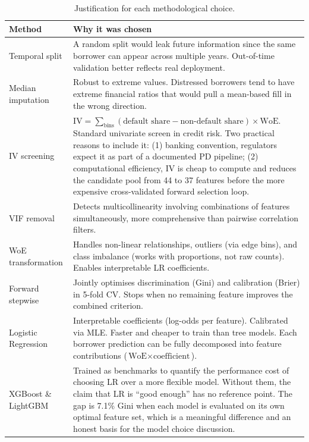 \documentclass[a4paper,11pt]{article}
\begin{document}
\begin{table}[H]
\centering
\begin{tabular}{L{3.5cm} L{11cm}}
\toprule
\textbf{Method} & \textbf{Why it was chosen} \\
\midrule
Temporal split &
  A random split would leak future information since the same borrower can
  appear across multiple years. Out-of-time validation better reflects real deployment. \\[0.4em]
Median imputation &
  Robust to extreme values. Distressed borrowers tend to have extreme financial
  ratios that would pull a mean-based fill in the wrong direction. \\[0.4em]
IV screening &
  $\text{IV} = \sum_{\text{bins}} (\text{default share} - \text{non-default share})
  \times \text{WoE}$. Standard univariate screen in credit risk. Two practical
  reasons to include it: (1) banking convention, regulators expect it as part of
  a documented PD pipeline; (2) computational efficiency, IV is cheap to compute
  and reduces the candidate pool from 44 to 37 features before the more expensive
  cross-validated forward selection loop. \\[0.4em]
VIF removal &
  Detects multicollinearity involving combinations of features simultaneously,
  more comprehensive than pairwise correlation filters. \\[0.4em]
WoE transformation &
  Handles non-linear relationships, outliers (via edge bins), and class imbalance
  (works with proportions, not raw counts). Enables interpretable LR coefficients. \\[0.4em]
Forward stepwise &
  Jointly optimises discrimination (Gini) and calibration (Brier) in 5-fold CV.
  Stops when no remaining feature improves the combined criterion. \\[0.4em]
Logistic Regression &
  Interpretable coefficients (log-odds per feature). Calibrated via MLE. Faster
  and cheaper to train than tree models. Each borrower prediction can be fully
  decomposed into feature contributions ($\text{WoE} \times \text{coefficient}$). \\[0.4em]
XGBoost \& LightGBM &
  Trained as benchmarks to quantify the performance cost of choosing LR over a
  more flexible model. Without them, the claim that LR is ``good enough'' has no
  reference point. The gap is 7.1\% Gini when each model is evaluated on its own
  optimal feature set, which is a meaningful difference and an honest basis for
  the model choice discussion. \\
\bottomrule
\end{tabular}
\caption{Justification for each methodological choice.}
\end{table}
\end{document}
